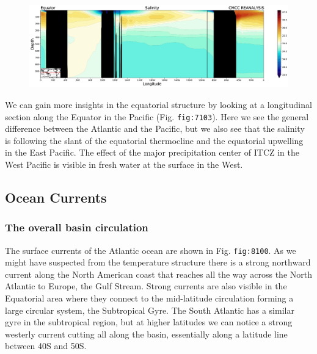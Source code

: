 \begin{figure}
	\centering
	\includegraphics[width = .7 \textwidth]{figs/GD/SectSalinityEquator1000.png}
	\caption{} \label{fig:}
\end{figure}

We can gain more insights in the equatorial structure by looking at a
longitudinal section along the Equator in the Pacific (Fig.
\texttt{fig:7103}). Here we see the general difference between the
Atlantic and the Pacific, but we also see that the salinity is following
the slant of the equatorial thermocline and the equatorial upwelling in
the East Pacific. The effect of the major precipitation center of ITCZ
in the West Pacific is visible in fresh water at the surface in the
West.

\subsection{Ocean Currents}\label{ocean-currents}

\subsubsection{The overall basin
	circulation}\label{the-overall-basin-circulation}

The surface currents of the Atlantic ocean are shown in Fig.
\texttt{fig:8100}. As we might have suspected from the temperature
structure there is a strong northward current along the North American
coast that reaches all the way across the North Atlantic to Europe, the
Gulf Stream. Strong currents are also visible in the Equatorial area
where they connect to the mid-latitude circulation forming a large
circular system, the Subtropical Gyre. The South Atlantic has a similar
gyre in the subtropical region, but at higher latitudes we can notice a
strong westerly current cutting all along the basin, essentially along a
latitude line between 40S and 50S.

